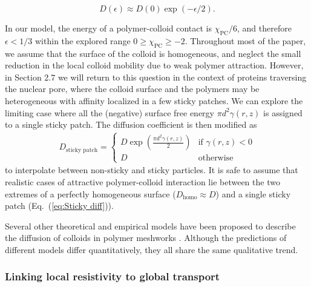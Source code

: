 \documentclass[12pt, a4paper]{article}
\begin{document}
\begin{equation}
    D(\epsilon)\approx D(0) \exp (-\epsilon / 2).
    \label{eq:Yamamoto}
\end{equation}

In our model, the energy of a polymer-colloid contact is $\chi_{\text{PC}}/6$, and therefore $\epsilon < 1/3$ within the explored range $0\geq\chi_{\text{PC}}\geq-2$.
Throughout most of the paper, we assume that the surface of the colloid is homogeneous, and neglect the small reduction in the local colloid mobility due to weak polymer attraction.
However, in Section 2.7 we will return to this question in the context of proteins traversing the nuclear pore, where the colloid surface and the polymers may be heterogeneous with affinity localized in a few sticky patches.
We can explore the limiting case where all the (negative) surface free energy $\pi d^2 \gamma(r,z)$ is assigned to a single sticky patch.
The diffusion coefficient is then modified as
\begin{eqnarray}
    D_{\text{sticky patch}} = 
    \begin{cases}
        D \exp(\frac{\pi d^2 \gamma(r,z)}{2}) & \text{if } \gamma(r,z) < 0 \\
        D & \text{otherwise}
    \end{cases}
     \label{eq:Sticky diff}
\end{eqnarray}
to interpolate between non-sticky and sticky particles.
It is safe to assume that realistic cases of attractive polymer-colloid interaction lie between the two extremes of a perfectly homogeneous surface ($D_\text{homo} \approx D$) and a single sticky patch (Eq.~(\ref{eq:Sticky diff})).

Several other theoretical and empirical models have been proposed to describe the diffusion of colloids in polymer meshworks \cite{Schweizer2003,Kohli2012,Holyst2009,Phillies1988}.
Although the predictions of different models differ quantitatively, they all share the same qualitative trend.



\subsubsection{Linking local resistivity to global transport}

\end{document}
